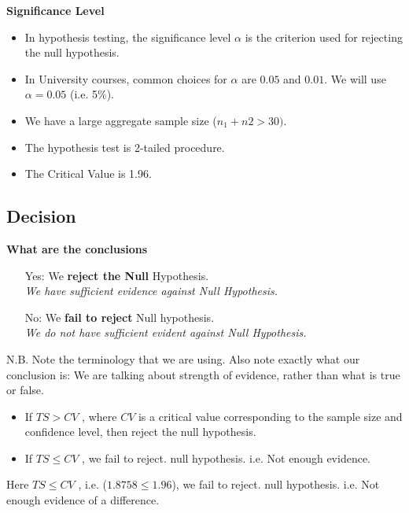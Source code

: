 \documentclass[a4paper,12pt]{article}
\begin{document}
\noindent \textbf{Significance Level}

\begin{itemize}
\item In hypothesis testing, the significance level $\alpha$ is the criterion used for rejecting the null hypothesis. 

\item In University courses, common choices for $\alpha$ are $0.05$ and $0.01$. We will use $\alpha =0.05$ (i.e. 5\%).
\item We have a large aggregate sample size ($n_1 + n2 > 30)$.
\item The hypothesis test is 2-tailed procedure.
\item The Critical Value is 1.96.
\end{itemize}




\newpage 
\subsection*{Decision}



\begin{framed}
\noindent \textbf{What are the conclusions}
	\begin{itemize} 
		
		\item[Yes:] We \textbf{reject the Null} Hypothesis. \\ \textit{We have sufficient evidence against Null Hypothesis.}
		
		\item[No:] We \textbf{fail to reject} Null hypothesis. \\ \textit{We do not have sufficient evident against Null Hypothesis.}
	\end{itemize}	
	{	\normalsize
		N.B. Note the terminology that we are using. Also note exactly what our conclusion is: We are talking about strength of evidence, rather than what is true or false.}
	
\end{framed}
	\smallskip
\begin{framed}
\begin{itemize}
	\item 	If $TS > CV$ , where $CV$ is a critical value corresponding to the sample size and confidence level, then reject the null hypothesis. 
	\item  If $TS \leq CV$ , we fail to reject. null hypothesis. i.e. Not enough evidence. 
	\end{itemize}	
\end{framed}	

\noindent Here $TS \leq CV$ , i.e. ($1.8758 \leq 1.96$), we fail to reject. null hypothesis. i.e. Not enough evidence of a difference. 
	
	
	
\end{document}
